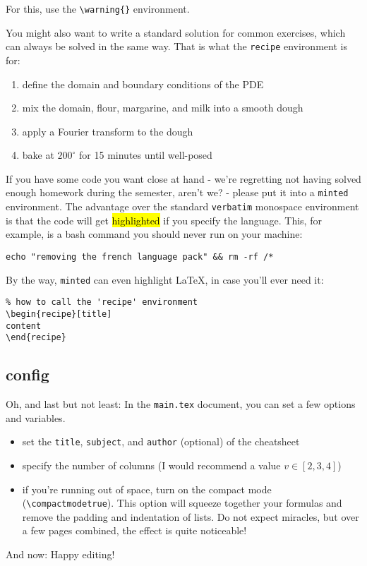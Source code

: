
For this, use the \texttt{\textbackslash warning\{\}} environment.

You might also want to write a standard solution for common exercises, which can always be solved in the same way. That is what the \texttt{recipe} environment is for:

\begin{recipe}
\begin{enumerate}
  \item define the domain and boundary conditions of the PDE
  \item mix the domain, flour, margarine, and milk into a smooth dough
  \item apply a Fourier transform to the dough
  \item bake at $200^\circ$ for 15 minutes until well-posed
\end{enumerate}
\end{recipe}

If you have some code you want close at hand - we're regretting not having solved enough homework during the semester, aren't we? - please put it into a \texttt{minted} environment. The advantage over the standard \texttt{verbatim} monospace environment is that the code will get \hl{highlighted} if you specify the language. This, for example, is a bash command you should never run on your machine:
\begin{verbatim}
echo "removing the french language pack" && rm -rf /*
\end{verbatim}

By the way, \texttt{minted} can even highlight LaTeX, in case you'll ever need it:

\begin{verbatim}
% how to call the 'recipe' environment
\begin{recipe}[title]
content
\end{recipe}
\end{verbatim}

\subsection{config}
Oh, and last but not least: In the \texttt{main.tex} document, you can set a few options and variables.

\begin{itemize}
 \item set the \texttt{title}, \texttt{subject}, and \texttt{author} (optional) of the cheatsheet
 \item specify the number of columns (I would recommend a value $v \in [2,3,4]$)
 \item if you're running out of space, turn on the compact mode (\texttt{\textbackslash compactmodetrue}). This option will squeeze together your formulas and remove the padding and indentation of lists. Do not expect miracles, but over a few pages combined, the effect is quite noticeable!
\end{itemize}

And now: Happy editing!
